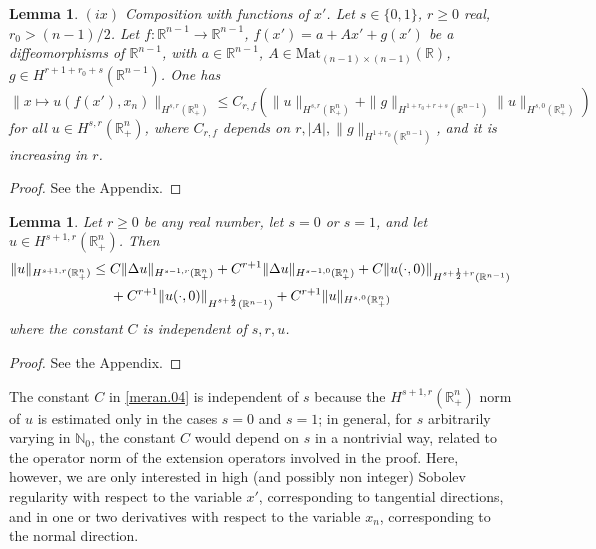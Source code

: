 \documentclass[10pt,reqno,a4paper]{article}
\numberwithin{equation}{section}
\theoremstyle{plain}
\newtheorem{lemma}[theorem]{Lemma}
\theoremstyle{definition}
\newenvironment{remark}{\pushQED{\qed} \remarkbase}{\popQED\endremarkbase}
\newcommand{\N}{{\mathbb N}}
\newcommand{\R}{{\mathbb R}}
\begin{document}
\begin{lemma}
$(ix)$ \emph{Composition with functions of $x'$}. 
Let $s \in \{ 0, 1 \}$, $r \geq 0$ real, $r_0 > (n-1)/2$.
Let $f : \R^{n-1} \to \R^{n-1}$, 
$f(x') = a + A x' + g(x')$
be a diffeomorphisms of $\R^{n-1}$, 
with $a \in \R^{n-1}$, 
$A \in \mathrm{Mat}_{(n-1) \times (n-1)}(\R)$,
$g \in H^{r+1+r_0+s}(\R^{n-1})$.
One has 
\begin{equation} 
\| x \mapsto u (f(x'),x_n) \|_{H^{s,r}(\R^n_+)} 
\leq C_{r,f} ( \| u \|_{H^{s,r}(\R^n_+)} 
+ \| g \|_{H^{1 + r_0 + r + s}(\R^{n-1})} \| u \|_{H^{s,0}(\R^n_+)} ) 
\label{composition.est.s.r} 
\end{equation}
for all $u \in H^{s,r}(\R^n_+)$,
where $C_{r,f}$ depends on $r, |A|, \| g \|_{H^{1+r_0}(\R^{n-1})}$,
and it is increasing in $r$.
\end{lemma}

\begin{proof} 
See the Appendix. 
\end{proof}


\begin{lemma} \label{lemma:est.Lap.R.n.+}
Let $r \geq 0$ be any real number, let $s=0$ or $s=1$, 
and let $u \in H^{s+1,r}(\R^n_+)$. Then 
\begin{align} 
\| u \|_{H^{s+1,r}(\R^n_+)} 
& \leq C \| \Delta u \|_{H^{s-1,r}(\R^n_+)} 
+ C^{r+1} \| \Delta u \|_{H^{s-1,0}(\R^n_+)} 
+ C \| u(\cdot, 0) \|_{H^{s + \frac12 + r}(\R^{n-1})}
\notag \\ 
& \quad \ 
+ C^{r+1} \| u(\cdot, 0) \|_{H^{s + \frac12}(\R^{n-1})}
+ C^{r+1} \| u \|_{H^{s,0}(\R^n_+)} 
\label{meran.04}
\end{align}
where the constant $C$ is independent of $s, r, u$. 
\end{lemma}


\begin{proof} 
See the Appendix. 
\end{proof}



\begin{remark}
The constant $C$ in \eqref{meran.04} is independent of $s$ 
because the $H^{s+1,r}(\R^n_+)$ norm of $u$ 
is estimated only in the cases $s = 0$ and $s=1$; 
in general, for $s$ arbitrarily varying in $\N_0$, 
the constant $C$ would depend on $s$ in a nontrivial way, 
related to the operator norm of the extension operators involved in the proof. 
Here, however, we are only interested in high (and possibly non integer) Sobolev regularity 
with respect to the variable $x'$, corresponding to tangential directions, 
and in one or two derivatives with respect to the variable $x_n$, 
corresponding to the normal direction. 
\end{remark}
\end{document}
